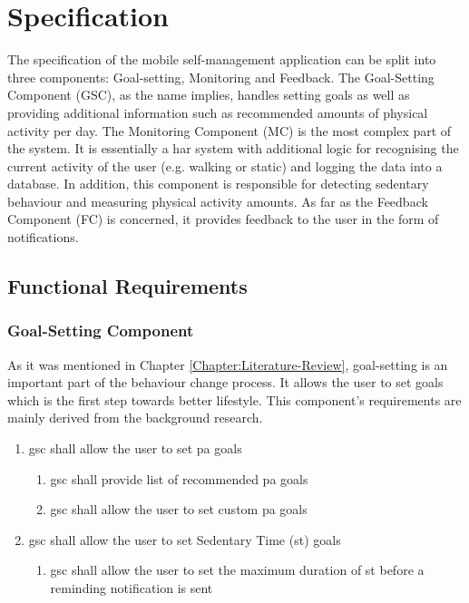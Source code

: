 \chapter{Specification}
\label{Chapter:Specification}

The specification of the mobile self-management application can be split into three components: Goal-setting, Monitoring and Feedback. The Goal-Setting Component (GSC), as the name implies, handles setting goals as well as providing additional information such as recommended amounts of physical activity per day. The Monitoring Component (MC) is the most complex part of the system. It is essentially a \gls{har} system with additional logic for recognising the current activity of the user (e.g. walking or static) and logging the data into a database. In addition, this component is responsible for detecting sedentary behaviour and measuring physical activity amounts. As far as the Feedback Component (FC) is concerned, it provides feedback to the user in the form of notifications. 
\section{Functional Requirements}

    \subsection{Goal-Setting Component}
    As it was mentioned in Chapter \ref{Chapter:Literature-Review},  goal-setting is an important part of the behaviour change process. It allows the user to set goals which is the first step towards better lifestyle. This component's requirements are mainly derived from the background research. 
    
    \begin{enumerate}
        \item \gls{gsc} shall allow the user to set \gls{pa} goals
        \begin{enumerate}
            \item \gls{gsc} shall provide list of recommended \gls{pa} goals
            \item \gls{gsc} shall allow the user to set custom \gls{pa} goals
        \end{enumerate}
        \item \gls{gsc} shall allow the user to set Sedentary Time (\gls{st}) goals
        \begin{enumerate}
            \item \gls{gsc} shall allow the user to set the maximum duration of \gls{st} before a reminding notification is sent 
        \end{enumerate}
    \end{enumerate}
    
